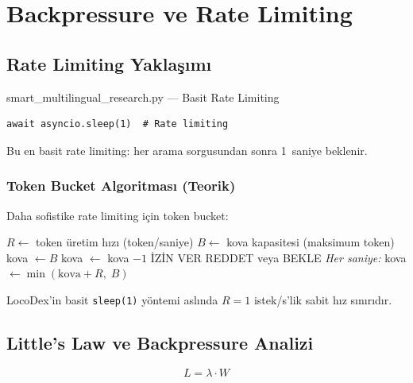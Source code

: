 \section{Backpressure ve Rate Limiting}
\label{sec:backpressure}

\subsection{Rate Limiting Yakla\c{s}{\i}m{\i}}
\label{sec:rate-limiting}

\begin{kodref}{smart\_multilingual\_research.py --- Basit Rate Limiting}
\begin{lstlisting}
await asyncio.sleep(1)  # Rate limiting
\end{lstlisting}
\end{kodref}

Bu en basit rate limiting: her arama sorgusundan sonra 1~saniye beklenir.

\subsubsection{Token Bucket Algoritmas{\i} (Teorik)}

Daha sofistike rate limiting i\c{c}in token bucket:

\begin{algorithm}[H]
\caption{Token Bucket Algoritmas{\i}}
\label{alg:token-bucket}
\begin{algorithmic}[1]
\State $R \gets$ token \"{u}retim h{\i}z{\i} (token/saniye)
\State $B \gets$ kova kapasitesi (maksimum token)
\State kova $\gets B$ 
    \State kova $\gets$ kova $- 1$
    \State \.{I}Z\.{I}N VER
  \Else
    \State REDDET veya BEKLE
  \EndIf
\EndFor
\State \textit{Her saniye:} kova $\gets \min(\text{kova} + R,\; B)$
\end{algorithmic}
\end{algorithm}

LocoDex'in basit \texttt{sleep(1)} y\"{o}ntemi asl{\i}nda $R = 1$ istek/s'lik sabit h{\i}z s{\i}n{\i}r{\i}d{\i}r.

\subsection{Little's Law ve Backpressure Analizi}
\label{sec:littles-law}

\begin{equation}
\label{eq:littles-law}
L = \lambda \cdot W
\end{equation}

